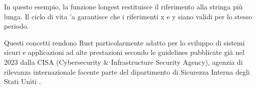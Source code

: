 In questo esempio, la funzione longest restituisce il riferimento alla stringa più lunga. Il ciclo di vita 'a garantisce che i riferimenti x e y siano validi per lo stesso periodo.

Questi concetti rendono Rust particolarmente adatto per lo sviluppo di sistemi sicuri e applicazioni ad alte prestazioni secondo le guidelines pubblicate già nel 2023 dalla CISA (Cybersecurity \& Infrastructure Security Agency), agenzia di rilevanza internazionale facente parte del dipartimento di Sicurezza Interna degli Stati Uniti \cite{CISA}.
